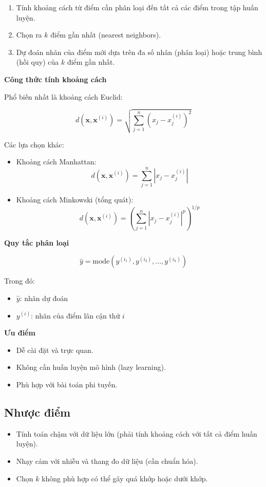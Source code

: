 \begin{enumerate}
    \item Tính khoảng cách từ điểm cần phân loại đến tất cả các điểm trong tập huấn luyện.
    \item Chọn ra \(k\) điểm gần nhất (nearest neighbors).
    \item Dự đoán nhãn của điểm mới dựa trên đa số nhãn (phân loại) hoặc trung bình (hồi quy) của \(k\) điểm gần nhất.
\end{enumerate}

\textbf{Công thức tính khoảng cách}

Phổ biến nhất là khoảng cách Euclid:

\[
d(\mathbf{x}, \mathbf{x}^{(i)}) = \sqrt{ \sum_{j=1}^n \left( x_j - x_j^{(i)} \right)^2 }
\]

Các lựa chọn khác:
\begin{itemize}
    \item Khoảng cách Manhattan:
    \[
    d(\mathbf{x}, \mathbf{x}^{(i)}) = \sum_{j=1}^n \left| x_j - x_j^{(i)} \right|
    \]
    \item Khoảng cách Minkowski (tổng quát):
    \[
    d(\mathbf{x}, \mathbf{x}^{(i)}) = \left( \sum_{j=1}^n \left| x_j - x_j^{(i)} \right|^p \right)^{1/p}
    \]
\end{itemize}

\textbf{Quy tắc phân loại}

\[
\hat{y} = \text{mode} \left( y^{(i_1)}, y^{(i_2)}, \dots, y^{(i_k)} \right)
\]

Trong đó:
\begin{itemize}
    \item \( \hat{y} \): nhãn dự đoán
    \item \( y^{(i)} \): nhãn của điểm lân cận thứ \(i\)
\end{itemize}

\textbf{Ưu điểm}

\begin{itemize}
    \item Dễ cài đặt và trực quan.
    \item Không cần huấn luyện mô hình (lazy learning).
    \item Phù hợp với bài toán phi tuyến.
\end{itemize}

\subsection*{Nhược điểm}

\begin{itemize}
    \item Tính toán chậm với dữ liệu lớn (phải tính khoảng cách với tất cả điểm huấn luyện).
    \item Nhạy cảm với nhiễu và thang đo dữ liệu (cần chuẩn hóa).
    \item Chọn \(k\) không phù hợp có thể gây quá khớp hoặc dưới khớp.
\end{itemize}

